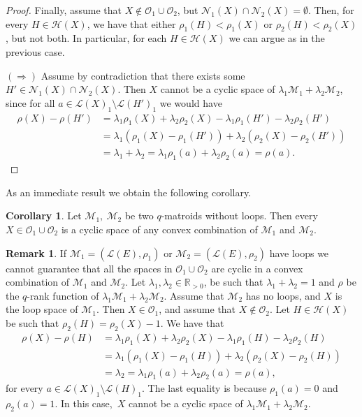 \documentclass[a4paper,11pt,reqno]{amsart}
\theoremstyle{definition}
\newtheorem{remark}[theorem]{{{Remark}}}
\newtheorem{corollary}[theorem]{{{Corollary}}}%
\newcommand{\mM}{\mathcal{M}}
\newcommand{\mL}{\mathcal{L}}
\newcommand{\mO}{\mathcal{O}}
\newcommand{\mN}{\mathcal{N}}
\newcommand{\mH}{\mathcal{H}}
\newcommand{\R}{\mathbb R}
\begin{document}
{\begin{proof}
    Finally, assume that $X\notin\mO_1\cup\mO_2$, but $\mN_1(X)\cap\mN_2(X)=\emptyset$. Then,
    for every $H\in\mH(X)$, we have that either $\rho_1(H)<\rho_1(X)$ or $\rho_2(H)<\rho_2(X)$, but not both. In particular, for each $H\in\mH(X)$ we can argue as in the previous case.

   $(\Longrightarrow)$ Assume by contradiction that there exists some $H'\in\mN_1(X)\cap\mN_2(X)$. Then $X$ cannot be a cyclic space of $\lambda_1\mM_1+\lambda_2\mM_2$, since for all  $a\in\mL(X)_1\setminus\mL(H')_1$ we would have
    \begin{align*}
        \rho(X)-\rho(H') &= \lambda_1\rho_1(X) + \lambda_2\rho_2(X) -\lambda_1\rho_1(H') - \lambda_2\rho_2(H') \\
        &=\lambda_1(\rho_1(X) - \rho_1(H')) + \lambda_2(\rho_2(X) - \rho_2(H')) \\
        &=\lambda_1+\lambda_2 =\lambda_1\rho_1(a) +\lambda_2\rho_2(a) =\rho(a).
        \end{align*}
\end{proof}

As an immediate result we obtain the following corollary. 

\begin{corollary}\label{coro:cyc_spaces_noloops}
     Let $\mM_1, \ \mM_2$ be two $q$-matroids without loops. 
     Then every $X\in\mO_1\cup\mO_2$ is a cyclic space of any convex combination of $\mM_1$ and $\mM_2$.
\end{corollary}

\begin{remark}
    If $\mM_1=(\mL(E),\rho_1)$ or $\mM_2=(\mL(E),\rho_2)$ have loops we cannot guarantee that all the spaces in $\mO_1\cup\mO_2$ are cyclic in a convex combination of $\mM_1$ and $\mM_2$. Let $\lambda_1,\lambda_2\in\R_{>0}$, be such that $\lambda_1+\lambda_2=1$ and $\rho$ be the $q$-rank function of $\lambda_1\mM_1+\lambda_2\mM_2$.
    Assume that $\mM_2$ has no loops, and $X$ is the loop space of $\mM_1$. Then $X\in\mO_1$, and assume that $X\notin\mO_2$. Let $H\in\mH(X)$ be such that $\rho_2(H)=\rho_2(X)-1$. We have that
    \begin{align*}
        \rho(X)-\rho(H) &= \lambda_1\rho_1(X) + \lambda_2\rho_2(X) -\lambda_1\rho_1(H) - \lambda_2\rho_2(H) \\
        &=\lambda_1(\rho_1(X) - \rho_1(H)) + \lambda_2(\rho_2(X) - \rho_2(H)) \\
        &=\lambda_2 = \lambda_1\rho_1(a) + \lambda_2\rho_2(a) =\rho(a),
    \end{align*}
    for every $a\in\mL(X)_1\setminus\mL(H)_1$. The last equality is because $\rho_1(a)=0$ and $\rho_2(a)=1$. In this case,~$X$ cannot be a cyclic space of $\lambda_1\mM_1+\lambda_2\mM_2$.
\end{remark}

}
\end{document}
